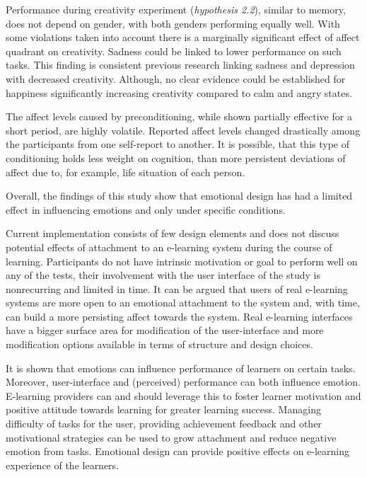 	Performance during creativity experiment (\textit{hypothesis 2.2}), similar to memory, does not depend on gender, with both genders performing equally well. With some violations taken into account there is a marginally significant effect of affect quadrant on creativity. Sadness could be linked to lower performance on such tasks. This finding is consistent previous research linking sadness and depression with decreased creativity. Although, no clear evidence could be established for happiness significantly increasing creativity compared to calm and angry states.
	
	The affect levels caused by preconditioning, while shown partially effective for a short period, are highly volatile. Reported affect levels changed drastically among the participants from one self-report to another. It is possible, that this type of conditioning holds less weight on cognition, than more persistent deviations of affect due to, for example, life situation of each person.
	
	
	
	Overall, the findings of this study show that emotional design has had a limited effect in influencing emotions and only under specific conditions.
	
	Current implementation consists of few design elements and does not discuss potential effects of attachment to an e-learning system during the course of learning. Participants do not have intrinsic motivation or goal to perform well on any of the tests, their involvement with the user interface of the study is nonrecurring and limited in time. It can be argued that users of real e-learning systems are more open to an emotional attachment to the system and, with time, can build a more persisting affect towards the system. Real e-learning interfaces have a bigger surface area for modification of the user-interface and more modification options available in terms of structure and design choices.
	
	It is shown that emotions can influence performance of learners on certain tasks. Moreover, user-interface and (perceived) performance can both influence emotion. E-learning providers can and should leverage this to foster learner motivation and positive attitude towards learning for greater learning success. Managing difficulty of tasks for the user, providing achievement feedback and other motivational strategies can be used to grow attachment and reduce negative emotion from tasks. Emotional design can provide positive effects on e-learning experience of the learners.

